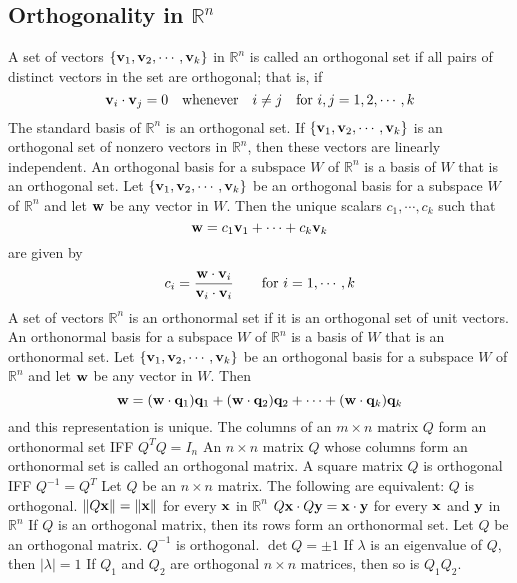 \documentclass{article}
\begin{document}
        \subsection{Orthogonality in \(\mathbb R^n\)} %
        \begin{outline}
            \1 A set of vectors \(\{\vb v_1,\vb v_2,\cdots,\vb v_k\}\) in \(\mathbb R^n\) is called an orthogonal set if all pairs of distinct vectors in the set are orthogonal; that is, if \[\vb v_i\cdot\vb v_j=0\quad\text{whenever}\quad i\neq j\quad\text{for }i,j=1,2,\cdots,k\]
            \1 The standard basis of \(\mathbb R^n\) is an orthogonal set. 
            \1 If \(\{\vb v_1,\vb v_2,\cdots,\vb v_k\}\) is an orthogonal set of nonzero vectors in \(\mathbb R^n\), then these vectors are linearly independent. 
            \1 An orthogonal basis for a subspace $W$ of \(\mathbb R^n\) is a basis of $W$ that is an orthogonal set. 
            \1 Let \(\{\vb v_1,\vb v_2,\cdots,\vb v_k\}\) be an orthogonal basis for a subspace $W$ of \(\mathbb R^n\) and let \(\vb w\) be any vector in $W$. Then the unique scalars \(c_1,\cdots,c_k\) such that \[\vb w=c_1\vb v_1+\cdots+c_k\vb v_k\] are given by \[c_i=\dfrac{\vb w\cdot\vb v_i}{\vb v_i\cdot \vb v_i}\qquad\text{for }i=1,\cdots,k\] 
            \1 A set of vectors \(\mathbb R^n\) is an orthonormal set if it is an orthogonal set of unit vectors. An orthonormal basis for a subspace $W$ of \(\mathbb R^n\) is a basis of $W$ that is an orthonormal set. 
            \1 Let \(\{\vb v_1,\vb v_2,\cdots,\vb v_k\}\) be an orthogonal basis for a subspace $W$ of \(\mathbb R^n\) and let \(\vb w\) be any vector in $W$. Then \[\vb w=(\vb w\cdot \vb q_1)\vb q_1+(\vb w\cdot\vb q_2)\vb q_2+\cdots+(\vb w\cdot\vb q_k)\vb q_k\] and this representation is unique. 
            \1 The columns of an \(m\times n\) matrix $Q$ form an orthonormal set IFF \(Q^TQ=I_n\)
            \1 An \(n\times n\) matrix $Q$ whose columns form an orthonormal set is called an orthogonal matrix. 
            \1 A square matrix \(Q\) is orthogonal IFF \(Q^{-1}=Q^T\)
            \1 Let $Q$ be an \(n\times n\) matrix. The following are equivalent:
                \2 $Q$ is orthogonal. 
                \2 \(\|Q\vb x\|=\|\vb x\|\) for every \(\vb x\) in \(\mathbb R^n\)
                \2 \(Q\vb x\cdot Q\vb y=\vb x\cdot\vb y\) for every \(\vb x\) and \(\vb y\) in \(\mathbb R^n\)
            \1 If $Q$ is an orthogonal matrix, then its rows form an orthonormal set. 
            \1 Let $Q$ be an orthogonal matrix. 
                \2 \(Q^{-1}\) is orthogonal. 
                \2 \(\det Q=\pm 1\)
                \2 If \(\lambda\) is an eigenvalue of $Q$, then \(|\lambda|=1\) 
                \2 If \(Q_1\) and \(Q_2\) are orthogonal \(n\times n\) matrices, then so is \(Q_1Q_2\). 

        \end{outline}
\end{document}

